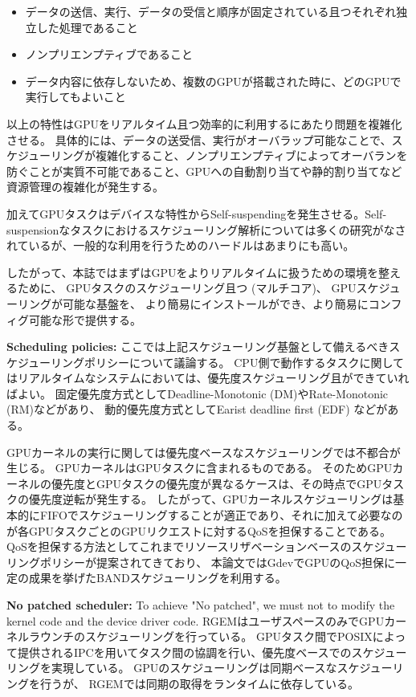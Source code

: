 \begin{itemize}
\item データの送信、実行、データの受信と順序が固定されている且つそれぞれ独立した処理であること
\item ノンプリエンプティブであること
\item データ内容に依存しないため、複数のGPUが搭載された時に、どのGPUで実行してもよいこと
\end{itemize}

以上の特性はGPUをリアルタイム且つ効率的に利用するにあたり問題を複雑化させる。
具体的には、データの送受信、実行がオーバラップ可能なことで、スケジューリングが複雑化すること、ノンプリエンプティブによってオーバランを防ぐことが実質不可能であること、GPUへの自動割り当てや静的割り当てなど資源管理の複雑化が発生する。

加えてGPUタスクはデバイスな特性からSelf-suspending\cite{self-sus:1,self-sus:2}を発生させる。Self-suspensionなタスクにおけるスケジューリング解析については多くの研究がなされているが\cite{chattopadhyay2014limited,kim2013segment}、一般的な利用を行うためのハードルはあまりにも高い。

したがって、本誌ではまずはGPUをよりリアルタイムに扱うための環境を整えるために、
GPUタスクのスケジューリング且つ (マルチコア)、
GPUスケジューリングが可能な基盤を、
より簡易にインストールができ、より簡易にコンフィグ可能な形で提供する。

\textbf{Scheduling policies:}
ここでは上記スケジューリング基盤として備えるべきスケジューリングポリシーについて議論する。
CPU側で動作するタスクに関してはリアルタイムなシステムにおいては、優先度スケジューリング且ができていればよい。
固定優先度方式としてDeadline-Monotonic (DM)\cite{sched:dm}やRate-Monotonic (RM)\cite{sched:rm}などがあり、
動的優先度方式としてEarist deadline first (EDF) などがある。

GPUカーネルの実行に関しては優先度ベースなスケジューリングでは不都合が生じる。
GPUカーネルはGPUタスクに含まれるものである。
そのためGPUカーネルの優先度とGPUタスクの優先度が異なるケースは、その時点でGPUタスクの優先度逆転が発生する。
したがって、GPUカーネルスケジューリングは基本的にFIFOでスケジューリングすることが適正であり、それに加えて必要なのが各GPUタスクごとのGPUリクエストに対するQoSを担保することである。
QoSを担保する方法としてこれまでリソースリザベーションベースのスケジューリングポリシーが提案\cite{gdev,cbs,tbs}されてきており、
本論文ではGdevでGPUのQoS担保に一定の成果を挙げたBANDスケジューリングを利用する。

\textbf{No patched scheduler:}
To achieve "No patched", we must not to modify the kernel code and the device driver code.
RGEMはユーザスペースのみでGPUカーネルラウンチのスケジューリングを行っている。
GPUタスク間でPOSIXによって提供されるIPCを用いてタスク間の協調を行い、優先度ベースでのスケジューリングを実現している。
GPUのスケジューリングは同期ベースなスケジューリングを行うが、
RGEMでは同期の取得をランタイムに依存している。

